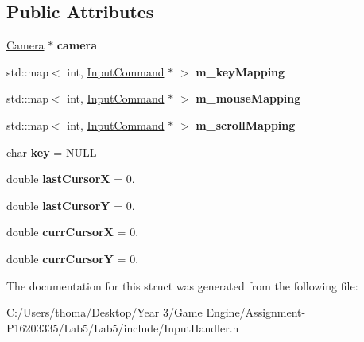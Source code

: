 \subsection*{Public Attributes}
\begin{DoxyCompactItemize}
\item 
\mbox{\label{struct_input_handler_a09f642c739d304e4a294ed8b40dbff42}} 
\mbox{\hyperlink{class_camera}{Camera}} $\ast$ {\bfseries camera}
\item 
\mbox{\label{struct_input_handler_ac089c27517f1a462473d7be25fb88d30}} 
std\+::map$<$ int, \mbox{\hyperlink{class_input_command}{Input\+Command}} $\ast$ $>$ {\bfseries m\+\_\+key\+Mapping}
\item 
\mbox{\label{struct_input_handler_a745769f1b79f57683392e79dcf740f74}} 
std\+::map$<$ int, \mbox{\hyperlink{class_input_command}{Input\+Command}} $\ast$ $>$ {\bfseries m\+\_\+mouse\+Mapping}
\item 
\mbox{\label{struct_input_handler_aa7c69583b29bf6dc6f56c8fe7374eb86}} 
std\+::map$<$ int, \mbox{\hyperlink{class_input_command}{Input\+Command}} $\ast$ $>$ {\bfseries m\+\_\+scroll\+Mapping}
\item 
\mbox{\label{struct_input_handler_ab535d1753d7a7c0ebf7179bb9676d163}} 
char {\bfseries key} = N\+U\+LL
\item 
\mbox{\label{struct_input_handler_af48314164051b008473523209fd97241}} 
double {\bfseries last\+CursorX} = 0.
\item 
\mbox{\label{struct_input_handler_a5ce2f330a4cfc9cecc5587fe60ab6a3b}} 
double {\bfseries last\+CursorY} = 0.
\item 
\mbox{\label{struct_input_handler_a20fc093ca80e7d69a852d692b3d2e23d}} 
double {\bfseries curr\+CursorX} = 0.
\item 
\mbox{\label{struct_input_handler_a4b7fa1c73021cfd3783a957d425fe1b7}} 
double {\bfseries curr\+CursorY} = 0.
\end{DoxyCompactItemize}


The documentation for this struct was generated from the following file\+:\begin{DoxyCompactItemize}
\item 
C\+:/\+Users/thoma/\+Desktop/\+Year 3/\+Game Engine/\+Assignment-\/\+P16203335/\+Lab5/\+Lab5/include/Input\+Handler.\+h\end{DoxyCompactItemize}
